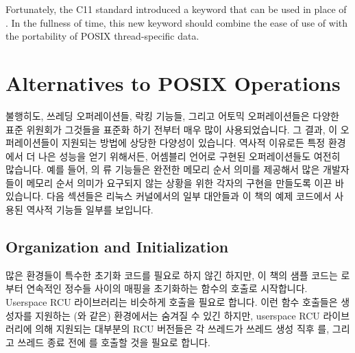 Fortunately, the C11 standard introduced a  keyword
that can be used in place of .
In the fullness of time, this new keyword should combine the ease of use
of  with the portability of POSIX thread-specific data.
\fi

\section{Alternatives to POSIX Operations}
\label{sec:toolsoftrade:Alternatives to POSIX Operations}

불행히도, 쓰레딩 오퍼레이션들, 락킹 기능들, 그리고 어토믹 오퍼레이션들은 다양한
표준 위원회가 그것들을 표준화 하기 전부터 매우 많이 사용되었습니다.
그 결과, 이 오퍼레이션들이 지원되는 방법에 상당한 다양성이 있습니다.
역사적 이유로든 특정 환경에서 더 나은 성능을 얻기 위해서든, 어셈블리 언어로
구현된 오퍼레이션들도 여전히 많습니다.
예를 들어, \GCC 의  류 기능들은 완전한 메모리 순서 의미를 제공해서
많은 개발자들이 메모리 순서 의미가 요구되지 않는 상황을 위한 각자의 구현을
만들도록 이끈 바 있습니다.
다음 섹션들은 리눅스 커널에서의 일부 대안들과 이 책의 예제 코드에서 사용된
역사적 기능들 일부를 보입니다.

\subsection{Organization and Initialization}
\label{sec:toolsoftrade:Organization and Initialization}

많은 환경들이 특수한 초기화 코드를 필요로 하지 않긴 하지만, 이 책의 샘플 코드는
 로부터 연속적인 정수들 사이의 매핑을 초기화하는 
함수의 호출로 시작합니다.
Userspace RCU 라이브러리는 비슷하게  호출을 필요로 합니다.
이런 함수 호출들은 생성자를 지원하는 (\GCC 와 같은) 환경에서는 숨겨질 수 있긴
하지만, userspace RCU 라이브러리에 의해 지원되는 대부분의 RCU 버전들은 각
쓰레드가 쓰레드 생성 직후  를, 그리고 쓰레드 종료
전에  를 호출할 것을 필요로 합니다.

